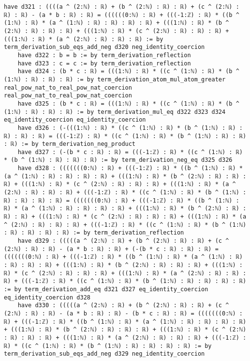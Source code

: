 \documentclass{article}
\begin{document}
\begin{tcolorbox}[colback=white!10, width=\linewidth]
\begin{lstlisting}[language=Lean4]
    have d321 : ((((a ^ (2:ℕ) : ℝ) + (b ^ (2:ℕ) : ℝ) : ℝ) + (c ^ (2:ℕ) : ℝ) : ℝ) - (a * b : ℝ) : ℝ) = ((((((0:ℕ) : ℝ) + (((-1:ℤ) : ℝ) * ((b ^ (1:ℕ) : ℝ) * (a ^ (1:ℕ) : ℝ) : ℝ) : ℝ) : ℝ) + (((1:ℕ) : ℝ) * (b ^ (2:ℕ) : ℝ) : ℝ) : ℝ) + (((1:ℕ) : ℝ) * (c ^ (2:ℕ) : ℝ) : ℝ) : ℝ) + (((1:ℕ) : ℝ) * (a ^ (2:ℕ) : ℝ) : ℝ) : ℝ) := by term_derivation_sub_eqs_add_neg d320 neg_identity_coercion
    have d322 : b = b := by term_derivation_reflection
    have d323 : c = c := by term_derivation_reflection
    have d324 : (b * c : ℝ) = (((1:ℕ) : ℝ) * ((c ^ (1:ℕ) : ℝ) * (b ^ (1:ℕ) : ℝ) : ℝ) : ℝ) := by term_derivation_atom_mul_atom_greater real_pow_nat_to_real_pow_nat_coercion real_pow_nat_to_real_pow_nat_coercion
    have d325 : (b * c : ℝ) = (((1:ℕ) : ℝ) * ((c ^ (1:ℕ) : ℝ) * (b ^ (1:ℕ) : ℝ) : ℝ) : ℝ) := by term_derivation_mul_eq d322 d323 d324 eq_identity_coercion eq_identity_coercion
    have d326 : (-(((1:ℕ) : ℝ) * ((c ^ (1:ℕ) : ℝ) * (b ^ (1:ℕ) : ℝ) : ℝ) : ℝ) : ℝ) = (((-1:ℤ) : ℝ) * ((c ^ (1:ℕ) : ℝ) * (b ^ (1:ℕ) : ℝ) : ℝ) : ℝ) := by term_derivation_neg_product
    have d327 : (-(b * c : ℝ) : ℝ) = (((-1:ℤ) : ℝ) * ((c ^ (1:ℕ) : ℝ) * (b ^ (1:ℕ) : ℝ) : ℝ) : ℝ) := by term_derivation_neg_eq d325 d326
    have d328 : (((((((0:ℕ) : ℝ) + (((-1:ℤ) : ℝ) * ((b ^ (1:ℕ) : ℝ) * (a ^ (1:ℕ) : ℝ) : ℝ) : ℝ) : ℝ) + (((1:ℕ) : ℝ) * (b ^ (2:ℕ) : ℝ) : ℝ) : ℝ) + (((1:ℕ) : ℝ) * (c ^ (2:ℕ) : ℝ) : ℝ) : ℝ) + (((1:ℕ) : ℝ) * (a ^ (2:ℕ) : ℝ) : ℝ) : ℝ) + (((-1:ℤ) : ℝ) * ((c ^ (1:ℕ) : ℝ) * (b ^ (1:ℕ) : ℝ) : ℝ) : ℝ) : ℝ) = (((((((0:ℕ) : ℝ) + (((-1:ℤ) : ℝ) * ((b ^ (1:ℕ) : ℝ) * (a ^ (1:ℕ) : ℝ) : ℝ) : ℝ) : ℝ) + (((1:ℕ) : ℝ) * (b ^ (2:ℕ) : ℝ) : ℝ) : ℝ) + (((1:ℕ) : ℝ) * (c ^ (2:ℕ) : ℝ) : ℝ) : ℝ) + (((1:ℕ) : ℝ) * (a ^ (2:ℕ) : ℝ) : ℝ) : ℝ) + (((-1:ℤ) : ℝ) * ((c ^ (1:ℕ) : ℝ) * (b ^ (1:ℕ) : ℝ) : ℝ) : ℝ) : ℝ) := by term_derivation_reflection
    have d329 : (((((a ^ (2:ℕ) : ℝ) + (b ^ (2:ℕ) : ℝ) : ℝ) + (c ^ (2:ℕ) : ℝ) : ℝ) - (a * b : ℝ) : ℝ) + (-(b * c : ℝ) : ℝ) : ℝ) = (((((((0:ℕ) : ℝ) + (((-1:ℤ) : ℝ) * ((b ^ (1:ℕ) : ℝ) * (a ^ (1:ℕ) : ℝ) : ℝ) : ℝ) : ℝ) + (((1:ℕ) : ℝ) * (b ^ (2:ℕ) : ℝ) : ℝ) : ℝ) + (((1:ℕ) : ℝ) * (c ^ (2:ℕ) : ℝ) : ℝ) : ℝ) + (((1:ℕ) : ℝ) * (a ^ (2:ℕ) : ℝ) : ℝ) : ℝ) + (((-1:ℤ) : ℝ) * ((c ^ (1:ℕ) : ℝ) * (b ^ (1:ℕ) : ℝ) : ℝ) : ℝ) : ℝ) := by term_derivation_add_eq d321 d327 eq_identity_coercion eq_identity_coercion d328
    have d330 : (((((a ^ (2:ℕ) : ℝ) + (b ^ (2:ℕ) : ℝ) : ℝ) + (c ^ (2:ℕ) : ℝ) : ℝ) - (a * b : ℝ) : ℝ) - (b * c : ℝ) : ℝ) = (((((((0:ℕ) : ℝ) + (((-1:ℤ) : ℝ) * ((b ^ (1:ℕ) : ℝ) * (a ^ (1:ℕ) : ℝ) : ℝ) : ℝ) : ℝ) + (((1:ℕ) : ℝ) * (b ^ (2:ℕ) : ℝ) : ℝ) : ℝ) + (((1:ℕ) : ℝ) * (c ^ (2:ℕ) : ℝ) : ℝ) : ℝ) + (((1:ℕ) : ℝ) * (a ^ (2:ℕ) : ℝ) : ℝ) : ℝ) + (((-1:ℤ) : ℝ) * ((c ^ (1:ℕ) : ℝ) * (b ^ (1:ℕ) : ℝ) : ℝ) : ℝ) : ℝ) := by term_derivation_sub_eqs_add_neg d329 neg_identity_coercion

\end{lstlisting}
\end{tcolorbox}
\end{document}
